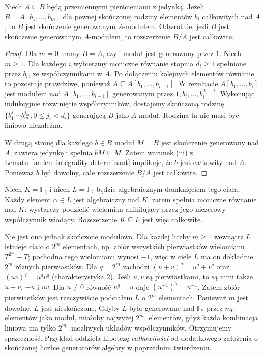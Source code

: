 \begin{twierdzenie}
\label{aa:tw:integral-finite-type-finite-module}
Niech $A\subseteq B$ będą przemiennymi pierścieniami z jedynką.
Jeżeli $B=A[b_1,\ldots,b_m]$ dla pewnej skończonej rodziny
elementów $b_i$ całkowitych nad $A$, to $B$ jest skończenie
generowanym $A$-modułem. Odwrotnie, jeśli $B$ jest
skończenie generowanym $A$-modułem, to rozszerzenie $B/A$
jest całkowite.
\end{twierdzenie}
\begin{proof}
Dla $m=0$ mamy $B=A$, czyli moduł jest generowany
przez $1$. Niech $m\ge1$. Dla każdego $i$ wybierzmy
moniczne równanie stopnia $d_i\ge1$ spełnione przez $b_i$,
ze współczynnikami w $A$. Po dołączeniu kolejnych
elementów równanie to pozostaje prawdziwe, ponieważ
$A\subseteq A[b_1,\ldots,b_{i-1}]$. W rezultacie
$A[b_1,\ldots,b_i]$ jest modułem nad
$A[b_1,\ldots,b_{i-1}]$ generowanym przez
$1,b_i,\ldots,b_i^{d_i-1}$. Wykonując indukcyjnie
rozwinięcie współczynników, dostajemy skończoną rodzinę
$\{b_1^{j_1}\cdots b_m^{j_m}:0\le j_i<d_i\}$
generującą $B$ jako $A$-moduł. Rodzina ta nie musi
być liniowo niezależna.

W drugą stronę dla każdego $b\in B$ moduł $M=B$
jest skończenie generowany nad $A$, zawiera jedynkę
i spełnia $bM\subseteq M$. Zatem warunek (iii) z
Lematu~\ref{aa:lem:integrality-determinant} implikuje,
że $b$ jest całkowity nad $A$. Ponieważ $b$ był dowolny,
całe rozszerzenie $B/A$ jest całkowite.
\end{proof}

\begin{przyklad}
\label{aa:prz:integral-infinite-extension}
Niech $K=\mathbb F_2$ i niech $L=\overline{\mathbb F}_2$
będzie algebraicznym domknięciem tego ciała. Każdy element
$\alpha\in L$ jest algebraiczny nad $K$, zatem spełnia
moniczne równanie nad $K$: wystarczy podzielić
wielomian anihilujący przez jego niezerowy współczynnik
wiodący. Rozszerzenie $K\subseteq L$ jest więc całkowite.

Nie jest ono jednak skończone modułowo. Dla każdej liczby
$m\ge1$ wewnątrz $L$ istnieje ciało o $2^m$ elementach,
np. zbiór wszystkich pierwiastków wielomianu
$T^{2^m}-T$; pochodna tego wielomianu wynosi $-1$,
więc w ciele $L$ ma on dokładnie $2^m$ różnych pierwiastków.
Dla $q=2^m$ zachodzi $(u+v)^q=u^q+v^q$ oraz
$(uv)^q=u^qv^q$ (charakterystyka $2$). Jeśli $u,v$ są
pierwiastkami, to są nimi także $u+v$, $-u$ i $uv$.
Dla $u\ne0$ równość $u^q=u$ daje
$(u^{-1})^q=u^{-1}$. Zatem zbiór pierwiastków
jest rzeczywiście podciałem $L$ o $2^m$ elementach.
Ponieważ $m$ jest dowolne, $L$ jest nieskończone.
Gdyby $L$ było generowane nad $\mathbb F_2$ przez
$m_0$ elementów jako moduł, miałoby najwyżej $2^{m_0}$
elementów, gdyż każda kombinacja liniowa ma tylko
$2^{m_0}$ możliwych układów współczynników.
Otrzymujemy sprzeczność. Przykład oddziela hipotezę
\emph{całkowitości} od dodatkowego założenia o skończonej
liczbie generatorów algebry w poprzednim twierdzeniu.
\end{przyklad}

